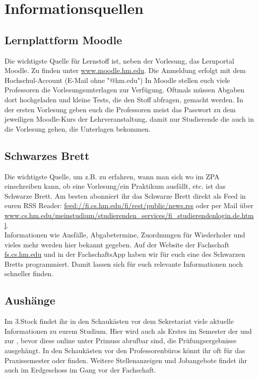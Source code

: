\section{Informationsquellen}

\subsection{Lernplattform Moodle}
Die wichtigste Quelle für Lernstoff ist, neben der Vorlesung, das Lernportal Moodle. Zu finden unter \url{www.moodle.hm.edu}.
Die Anmeldung erfolgt mit dem Hochschul-Account (E-Mail ohne "@hm.edu")\doublebreak
In Moodle stellen euch viele Professoren die Vorlesungsunterlagen zur Verfügung. Oftmals müssen Abgaben dort hochgeladen und kleine Tests, die den Stoff abfragen, gemacht werden.
In der ersten Vorlesung geben euch die Professoren meist das Passwort zu dem jeweiligen Moodle-Kurs der Lehrveranstaltung, damit nur Studierende die auch in die Vorlesung gehen, die Unterlagen bekommen.

\subsection{Schwarzes Brett}
Die wichtigste Quelle, um z.B. zu erfahren, wann man sich wo im ZPA einschreiben kann, ob eine Vorlesung/ein Praktikum ausfällt, etc. ist das Schwarze Brett.\doublebreak 
Am besten abonniert ihr das Schwarze Brett direkt als Feed in euren RSS Reader: \url{feed://fi.cs.hm.edu/fi/rest/public/news.rss} oder per Mail über \url{www.cs.hm.edu/meinstudium/studierenden\_services/fi\_studierendenlogin.de.html}.\\
Informationen wie Ausfälle, Abgabetermine, Zuordnungen für Wiederholer und vieles mehr werden hier bekannt gegeben.
Auf der Website der Fachschaft \url{fs.cs.hm.edu} und in der FachschaftsApp haben wir für euch eine  des Schwarzen Bretts
programmiert. Damit lassen sich für euch relevante Informationen noch schneller finden.

\subsection{Aushänge}
Im 3.Stock findet ihr in den Schaukästen vor dem Sekretariat viele 
aktuelle Informationen zu eurem Studium. Hier wird auch als Erstes im 
Semester der  und zur , bevor diese 
online unter Primuss abrufbar sind, die Prüfungsergebnisse ausgehängt. In den
Schaukästen vor den Professorenbüros könnt ihr oft  
für das Praxissemester oder  finden. 
Weitere Stellenanzeigen und Jobangebote findet ihr auch im 
Erdgeschoss im Gang vor der Fachschaft. 

